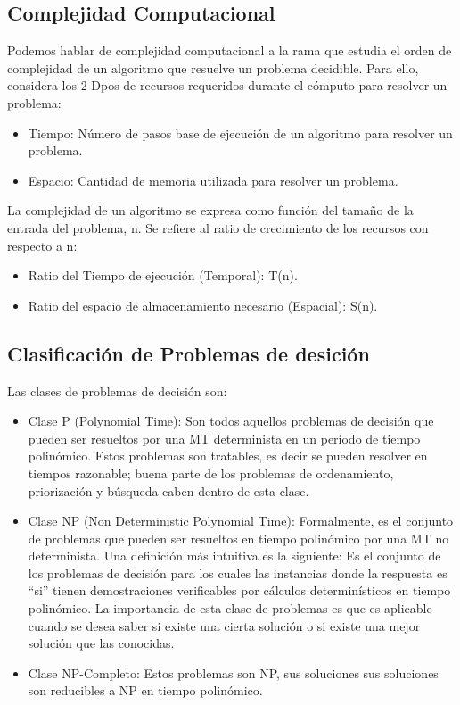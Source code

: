 \documentclass[12pt,twoside]{article}
\begin{document}
\subsection{\textbf{Complejidad Computacional}}
\setlength{\parindent}{1.5em}
Podemos hablar de complejidad computacional a la rama que estudia el orden de complejidad de un algoritmo que 
resuelve un problema decidible. Para ello, considera los 2 Dpos de recursos requeridos durante el cómputo para resolver un problema:
\begin{itemize}
  \item Tiempo: Número de pasos base de ejecución de un algoritmo para resolver un problema.
  \item Espacio: Cantidad de memoria utilizada para resolver un problema.

\end{itemize}

La complejidad de un algoritmo se expresa como función del tama\~no de la entrada del problema, n.
Se refiere al ratio de crecimiento de los recursos con respecto a n:
\begin{itemize}
  \item Ratio del Tiempo de ejecución (Temporal): T(n).
  \item Ratio del espacio de almacenamiento necesario (Espacial): S(n).
\end{itemize}
\centerline{}
\subsection{\textbf{Clasificaci\'on de Problemas de desici\'on}}
\setlength{\parindent}{1.5em}

Las clases de problemas de decisión son:
\begin{itemize}
  \item Clase P (Polynomial Time): Son todos aquellos problemas de decisión que pueden ser resueltos por una MT determinista en un 
    período de tiempo polinómico. Estos problemas son tratables, es decir se pueden resolver en tiempos razonable; buena parte de 
    los problemas de ordenamiento, priorización y búsqueda caben dentro de esta clase.
  \item Clase NP (Non Deterministic Polynomial Time): Formalmente, es el conjunto de problemas que pueden ser resueltos en tiempo 
    polinómico por una MT no determinista. Una definición más intuitiva es la siguiente: Es el conjunto de los problemas de 
    decisión para los cuales las instancias donde la respuesta es “si” tienen demostraciones verificables por cálculos 
    determinísticos en tiempo polinómico. La importancia de esta clase de problemas es que es aplicable cuando se desea saber
    si existe una cierta solución o si existe una mejor solución que las conocidas.
  \item Clase NP-Completo: Estos problemas son NP, sus soluciones sus soluciones son reducibles a NP en tiempo polinómico.

\end{itemize}
\end{document}
